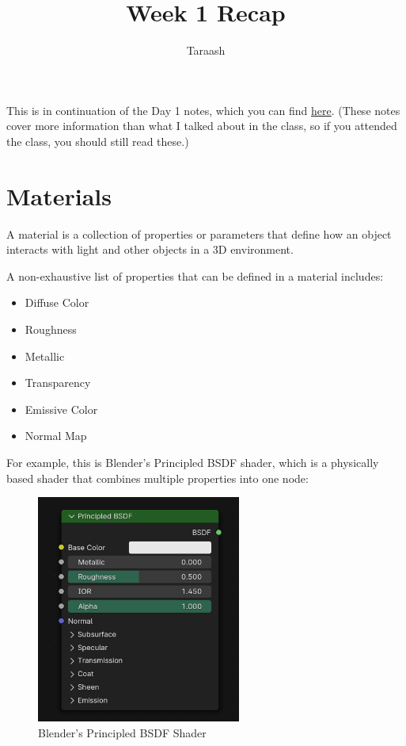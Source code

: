 \documentclass{article}
\title{Week 1 Recap}
\author{Taraash}
\date{}
\begin{document}
\maketitle

\tableofcontents
\newpage

This is in continuation of the Day 1 notes, which you can find \href{https://drive.google.com/file/d/1gTv4I6fxLQCYuvl5RoD4AZJ5WyXFFGp4/view?usp=sharing}{here}. (These notes cover more information than what I talked about in the class, so if you attended the class, you should still read these.)

\section{Materials}
A material is a collection of properties or parameters that define how an object interacts with light and other objects in a 3D environment.

A non-exhaustive list of properties that can be defined in a material includes:
\begin{itemize}
    \item Diffuse Color
    \item Roughness
    \item Metallic
    \item Transparency
    \item Emissive Color
    \item Normal Map
\end{itemize}

For example, this is Blender's Principled BSDF shader, which is a physically based shader that combines multiple properties into one node:

\begin{figure}[h]
    \centering
    \includegraphics[width=0.6\textwidth]{week1/image.png}
    \caption{Blender's Principled BSDF Shader}
    \label{fig:principled_bsdf}
\end{figure}
\end{document}
